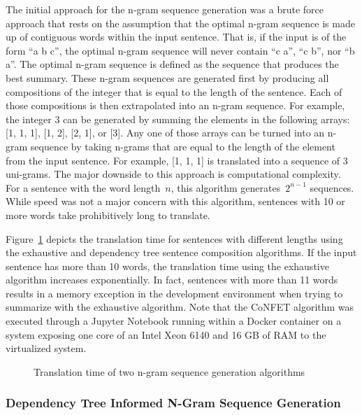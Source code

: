 \documentclass{article}[10]
\begin{document}
The initial approach for the n-gram sequence generation was a brute force approach that rests on the assumption that the optimal n-gram sequence is made up of contiguous words within the input sentence. That is, if the input is of the form ``a b c'', the optimal n-gram sequence will never contain ``c a'', ``c b'', nor ``b a''. The optimal n-gram sequence is defined as the sequence that produces the best summary. These n-gram sequences are generated first by producing all compositions of the integer that is equal to the length of the sentence. Each of those compositions is then extrapolated into an n-gram sequence. For example, the integer 3 can be generated by summing the elements in the following arrays: [1, 1, 1], [1, 2], [2, 1], or [3]. Any one of those arrays can be turned into an n-gram sequence by taking n-grams that are equal to the length of the element from the input sentence. For example, [1, 1, 1] is translated into a sequence of 3 uni-grams. The major downside to this approach is computational complexity. For a sentence with the word length~\(n\), this algorithm generates~\(2^{n-1}\) sequences. While speed was not a major concern with this algorithm, sentences with 10 or more words take prohibitively long to translate.

Figure~\ref{fig:timing} depicts the translation time for sentences with different lengths using the exhaustive and dependency tree sentence composition algorithms. If the input sentence has more than 10 words, the translation time using the exhaustive algorithm increases exponentially. In fact, sentences with more than 11 words results in a memory exception in the development environment when trying to summarize with the exhaustive algorithm. Note that the CoNFET algorithm was executed through a Jupyter Notebook running within a Docker container on a system exposing one core of an Intel Xeon 6140 and 16 GB of RAM to the virtualized system.

\begin{figure}[h]
  \begin{center}
    \scalebox{0.6}{}
    \caption{Translation time of two n-gram sequence generation
      algorithms\label{fig:timing}}
  \end{center}
\end{figure}

\subsubsection{Dependency Tree Informed N-Gram Sequence Generation\label{sec:dependency}}
\end{document}
